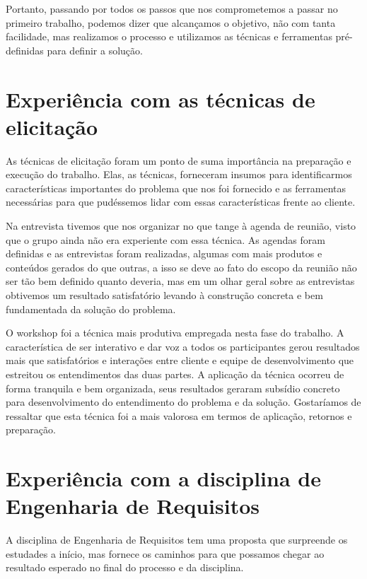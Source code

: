     Portanto, passando por todos os passos que nos comprometemos a passar no primeiro trabalho, 
  podemos dizer que alcançamos o objetivo, não com tanta facilidade, mas realizamos o processo e utilizamos as 
  técnicas e ferramentas pré-definidas para definir a solução.
  
  \section{Experiência com as técnicas de elicitação}
  
    As técnicas de elicitação foram um ponto de suma importância na preparação e execução do trabalho. 
  Elas, as técnicas, forneceram insumos para identificarmos características importantes do problema que nos 
  foi fornecido e as ferramentas necessárias para que pudéssemos lidar com essas características frente ao cliente.
    
    Na entrevista tivemos que nos organizar no que tange à agenda de reunião, visto que o grupo ainda não era 
  experiente com essa técnica. As agendas foram definidas e as entrevistas foram realizadas, algumas com mais 
  produtos e conteúdos gerados do que outras, a isso se deve ao fato do escopo da reunião não ser tão 
  bem definido quanto deveria, mas em um olhar geral sobre as entrevistas obtivemos um resultado satisfatório 
  levando à construção concreta e bem fundamentada da solução do problema.
    
    O workshop foi a técnica mais produtiva empregada nesta fase do trabalho. A característica de ser interativo 
  e dar voz a todos os participantes gerou resultados mais que satisfatórios e interações entre cliente e equipe 
  de desenvolvimento que estreitou os entendimentos das duas partes. A aplicação da técnica ocorreu de forma tranquila 
  e bem organizada, seus resultados geraram subsídio concreto para desenvolvimento do entendimento do problema e da solução. 
  Gostaríamos de ressaltar que esta técnica foi a mais valorosa em termos de aplicação, retornos e preparação. 
  
  \section{Experiência com a disciplina de Engenharia de Requisitos}
    
    A disciplina de Engenharia de Requisitos tem uma proposta que surpreende os estudades a início, 
  mas fornece os caminhos para que possamos chegar ao resultado esperado no final do processo e da disciplina.
    
